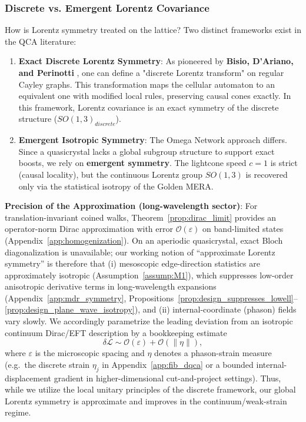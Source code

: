 \subsubsection{Discrete vs. Emergent Lorentz Covariance}
How is Lorentz symmetry treated on the lattice? Two distinct frameworks exist in the QCA literature:
\begin{enumerate}
    \item \textbf{Exact Discrete Lorentz Symmetry}: As pioneered by \textbf{Bisio, D'Ariano, and Perinotti} \cite{Bisio2015}, one can define a "discrete Lorentz transform" on regular Cayley graphs. This transformation maps the cellular automaton to an equivalent one with modified local rules, preserving causal cones exactly. In this framework, Lorentz covariance is an exact symmetry of the discrete structure ($SO(1,3)_{discrete}$).
    \item \textbf{Emergent Isotropic Symmetry}: The Omega Network approach differs. Since a quasicrystal lacks a global subgroup structure to support exact boosts, we rely on \textbf{emergent symmetry}. The lightcone speed $c=1$ is strict (causal locality), but the continuous Lorentz group $SO(1,3)$ is recovered only via the statistical isotropy of the Golden MERA.
\end{enumerate}
\textbf{Precision of the Approximation (long-wavelength sector)}: For translation-invariant coined walks, Theorem~\ref{prop:dirac_limit} provides an operator-norm Dirac approximation with error $\mathcal{O}(\varepsilon)$ on band-limited states (Appendix~\ref{app:homogenization}). On an aperiodic quasicrystal, exact Bloch diagonalization is unavailable; our working notion of ``approximate Lorentz symmetry'' is therefore that (i) mesoscopic edge-direction statistics are approximately isotropic (Assumption~\ref{assump:M1}), which suppresses low-order anisotropic derivative terms in long-wavelength expansions (Appendix~\ref{app:mdr_symmetry}, Propositions~\ref{prop:design_suppresses_lowell}--\ref{prop:design_plane_wave_isotropy}), and (ii) internal-coordinate (phason) fields vary slowly. We accordingly parametrize the leading deviation from an isotropic continuum Dirac/EFT description by a bookkeeping estimate
\begin{equation}
    \delta \mathcal{L} \sim \mathcal{O}(\varepsilon) + \mathcal{O}(\|\eta\|),
\end{equation}
where $\varepsilon$ is the microscopic spacing and $\eta$ denotes a phason-strain measure (e.g.\ the discrete strain $\eta_j$ in Appendix~\ref{app:fib_dqca} or a bounded internal-displacement gradient in higher-dimensional cut-and-project settings). Thus, while we utilize the local unitary principles of the discrete framework, our global Lorentz symmetry is approximate and improves in the continuum/weak-strain regime.

